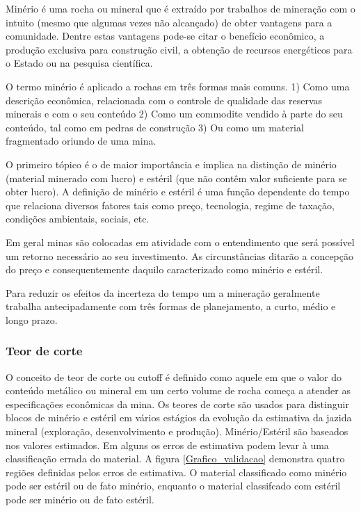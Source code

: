  	Minério é uma rocha ou mineral que é extraído por trabalhos de mineração com o intuito (mesmo que algumas vezes não alcançado) de obter vantagens para a comunidade. Dentre estas vantagens pode-se citar o benefício econômico, a produção exclusiva para construção civil, a obtenção de recursos energéticos para  o Estado ou na pesquisa científica.
 	
 	O termo minério é aplicado a rochas em três formas mais comuns. 1) Como uma descrição econômica, relacionada com o controle de qualidade das reservas minerais e com o seu conteúdo 2) Como um commodite vendido à parte do seu conteúdo, tal como em pedras de construção 3) Ou como um material fragmentado oriundo de uma mina. 
 	
 	O primeiro tópico é o de  maior importância e implica na distinção de minério (material minerado com lucro) e estéril (que não contêm valor suficiente para se obter lucro). A definição de minério e estéril é uma função dependente do tempo que relaciona diversos fatores tais como preço, tecnologia, regime de taxação, condições ambientais, sociais, etc. 
 	
 	Em geral minas são colocadas em atividade com o entendimento que será possível um retorno necessário ao seu investimento. As circunstâncias ditarão a concepção do preço e consequentemente daquilo caracterizado como minério e estéril. 
 	
 	Para reduzir os efeitos da incerteza do tempo um a mineração geralmente trabalha antecipadamente com três formas de planejamento, a curto, médio e longo prazo. 
 	
 	\subsubsection{Teor de corte}
 	
 	O conceito de teor de corte ou cutoff é definido como aquele em que o valor do conteúdo metálico ou mineral em um certo volume de rocha começa a atender as especificações econômicas da mina. Os teores de corte são usados para distinguir blocos de minério e estéril em vários estágios da evolução da estimativa da jazida mineral (exploração, desenvolvimento e produção). Minério/Estéril são baseados nos valores estimados. Em alguns os erros de estimativa podem levar à uma classificação errada do material. A figura \eqref{Grafico_validacao} demonstra quatro regiões definidas pelos erros de estimativa. O material classificado como minério pode ser estéril ou de fato minério, enquanto o material classifcado com estéril pode ser minério ou  de fato estéril.   
 	
